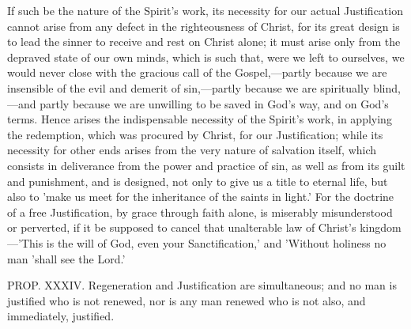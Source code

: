 \documentclass[
]{book}
\begin{document}
If such be the nature of the Spirit's work, its necessity for our actual Justification cannot arise from any defect in the righteousness of Christ, for its great design is to lead the sinner to receive and rest on Christ alone; it must arise only from the depraved state of our own minds, which is such that, were we left to ourselves, we would never close with the gracious call of the Gospel,---partly because we are insensible of the evil and demerit of sin,---partly because we are spiritually blind,---and partly because we are unwilling to be saved in God's way, and on God's terms. Hence arises the indispensable necessity of the Spirit's work, in applying the redemption, which was procured by Christ, for our Justification; while its necessity for other ends arises from the very nature of salvation itself, which consists in deliverance from the power and practice of sin, as well as from its guilt and punishment, and is designed, not only to give us a title to eternal life, but also to 'make us meet for the inheritance of the saints in light.' For the doctrine of a free Justification, by grace through faith alone, is miserably misunderstood or perverted, if it be supposed to cancel that unalterable law of Christ's kingdom---'This is the will of God, even your Sanctification,' and 'Without holiness no man 'shall see the Lord.'

PROP. XXXIV. Regeneration and Justification are simultaneous; and no man is justified who is not renewed, nor is any man renewed who is not also, and immediately, justified.
\end{document}
